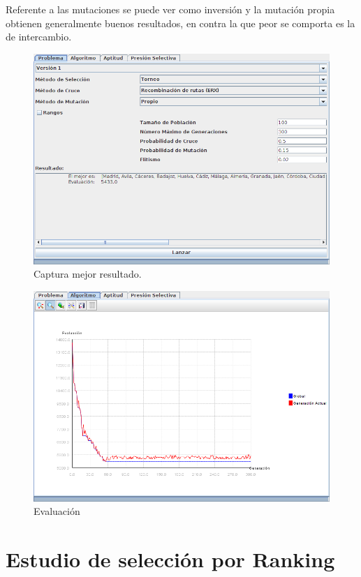 \documentclass[12pt]{article}
\begin{document}
	Referente a las mutaciones se puede ver como inversión y la mutación propia obtienen generalmente buenos resultados, en contra la que peor se comporta es la de intercambio.

\begin{figure}[H]
\centering
\includegraphics[scale=0.4]{graficas/fig1}
\caption{Captura mejor resultado.}
\end{figure}

\begin{figure}[H]
\centering
\includegraphics[scale=0.4]{graficas/fig1graf}
\caption{Evaluación}
\end{figure} 

\section{Estudio de selección por Ranking}
\end{document}
